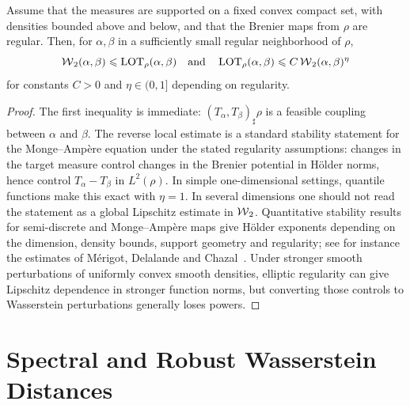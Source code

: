 \begin{prop}\label{prop-linear-ot-stability}
	Assume that the measures are supported on a fixed convex compact set, with densities bounded above and below, and that the Brenier maps from $\rho$ are regular. Then, for $\alpha,\beta$ in a sufficiently small regular neighborhood of $\rho$,
	\[
		\operatorname{\mathcal{W}}_2(\alpha,\beta)\leqslant \operatorname{LOT}_\rho(\alpha,\beta)
		\quad\text{and}\quad
		\operatorname{LOT}_\rho(\alpha,\beta)\leqslant C\operatorname{\mathcal{W}}_2(\alpha,\beta)^\eta
	\]
	for constants $C>0$ and $\eta\in(0,1]$ depending on regularity.
\end{prop}
\begin{proof}
	The first inequality is immediate: $(T_\alpha,T_\beta)_\sharp\rho$ is a feasible coupling between $\alpha$ and $\beta$. The reverse local estimate is a standard stability statement for the Monge--Amp\`ere equation under the stated regularity assumptions: changes in the target measure control changes in the Brenier potential in H\"older norms, hence control $T_\alpha-T_\beta$ in $L^2(\rho)$. In simple one-dimensional settings, quantile functions make this exact with $\eta=1$.
	In several dimensions one should not read the statement as a global Lipschitz estimate in $\operatorname{\mathcal{W}}_2$. Quantitative stability results for semi-discrete and Monge--Amp\`ere maps give H\"older exponents depending on the dimension, density bounds, support geometry and regularity; see for instance the estimates of M\'erigot, Delalande and Chazal~\cite{merigot2020stability}. Under stronger smooth perturbations of uniformly convex smooth densities, elliptic regularity can give Lipschitz dependence in stronger function norms, but converting those controls to Wasserstein perturbations generally loses powers.
\end{proof}

\section{Spectral and Robust Wasserstein Distances}
\label{sec-spectral-subspace-wasserstein}

